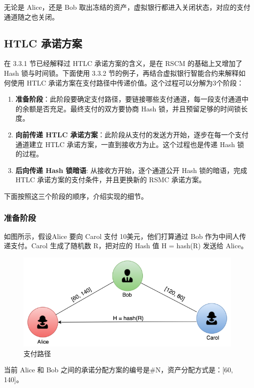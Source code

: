 无论是 Alice，还是 Bob 取出冻结的资产，虚拟银行都进入关闭状态，对应的支付通道随之也关闭。


\subsection{HTLC 承诺方案}
在 3.3.1 节已经解释过 HTLC 承诺方案的含义，是在 RSCM 的基础上又增加了 Hash 锁与时间锁。下面使用 3.3.2 节的例子，再结合虚拟银行智能合约来解释如何使用 HTLC 承诺方案在支付路径中传递价值。这个过程可以分解为3个阶段：
\begin{enumerate}
    \item \textbf{准备阶段}：此阶段要确定支付路径，要链接哪些支付通道，每一段支付通道中的余额是否充足。最终支付的双方要协商 Hash 锁，并且预留足够的时间锁长度。
    \item \textbf{向前传递 HTLC 承诺方案}：此阶段从支付的发送方开始，逐步在每一个支付通道建立 HTLC 承诺方案，一直到接收方为止。这个过程也是传递 Hash 锁的过程。
    \item \textbf{后向传递 Hash 锁暗语}: 从接收方开始，逐个通道公开 Hash 锁的暗语，完成 HTLC 承诺方案的支付条件，并且更换新的 RSMC 承诺方案。
\end{enumerate}

下面按照这三个阶段的顺序，介绍实现的细节。

\subsubsection{准备阶段}

如图所示，假设Alice 要向 Carol 支付 10美元，他们打算通过 Bob 作为中间人传递支付。Carol 生成了随机数 R，把对应的 Hash 值 H = hash(R) 发送给 Alice。

\begin{figure}[h!]
    \centering
    \includegraphics[width=12cm, keepaspectratio]{../images/channels.png}
    \caption{支付路径}
    \label{fig:channels}
\end{figure}


当前 Alice 和 Bob 之间的承诺分配方案的编号是\#N，资产分配方式是：[60, 140]。

